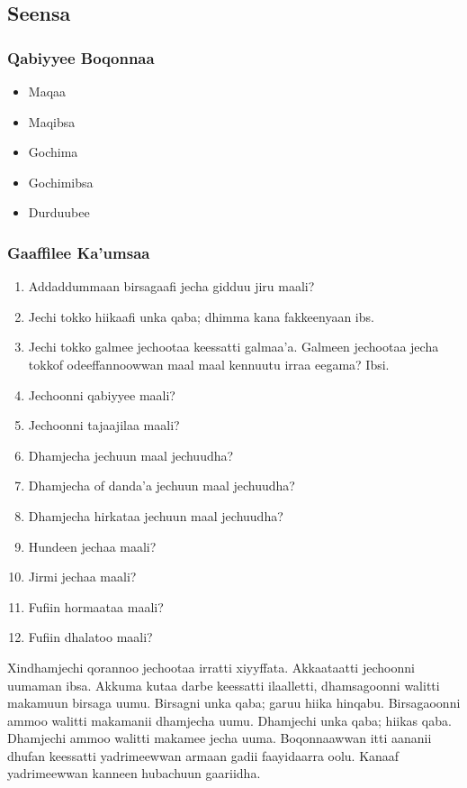 \documentclass[11pt,b5paper]{book}
\begin{document}
\begin{itemize}
\subsection{Seensa}

\subsubsection{Qabiyyee Boqonnaa}

\begin{itemize}
  \item Maqaa
  \item Maqibsa
  \item Gochima
  \item Gochimibsa
  \item Durduubee
  
\end{itemize}

\subsubsection{Gaaffilee Ka'umsaa}

\begin{enumerate}
  \item Addaddummaan birsagaafi jecha gidduu jiru maali?
  \item Jechi tokko hiikaafi unka qaba; dhimma kana fakkeenyaan ibs.
  \item Jechi tokko galmee jechootaa keessatti galmaa’a. Galmeen jechootaa jecha tokkof odeeffannoowwan maal maal kennuutu irraa eegama? Ibsi.
  \item Jechoonni qabiyyee maali?
  \item Jechoonni tajaajilaa maali?
  \item Dhamjecha jechuun maal jechuudha?
  \item Dhamjecha of danda’a jechuun maal jechuudha?
  \item Dhamjecha hirkataa jechuun maal jechuudha?
  \item Hundeen jechaa maali?
  \item Jirmi jechaa maali?
  \item Fufiin hormaataa maali?
  \item Fufiin dhalatoo maali?

\end{enumerate}

Xindhamjechi qorannoo jechootaa irratti xiyyffata. Akkaataatti jechoonni uumaman ibsa. Akkuma kutaa darbe keessatti ilaalletti, dhamsagoonni walitti makamuun birsaga uumu. Birsagni unka qaba; garuu hiika hinqabu. Birsagaoonni ammoo walitti makamanii dhamjecha uumu. Dhamjechi unka qaba; hiikas qaba. Dhamjechi ammoo walitti makamee jecha uuma. Boqonnaawwan itti aananii dhufan keessatti yadrimeewwan armaan gadii faayidaarra oolu. Kanaaf yadrimeewwan kanneen hubachuun gaariidha. 


\end{itemize}
\end{document}
